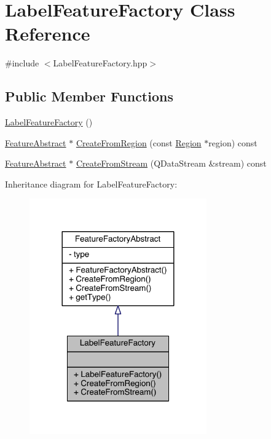 \hypertarget{class_label_feature_factory}{\section{Label\+Feature\+Factory Class Reference}
\label{class_label_feature_factory}
}


{\ttfamily \#include $<$Label\+Feature\+Factory.\+hpp$>$}

\subsection*{Public Member Functions}
\begin{DoxyCompactItemize}
\item 
\hyperlink{class_label_feature_factory_ab7fc88ba9a535add8497ca772786ee7b}{Label\+Feature\+Factory} ()
\item 
\hyperlink{class_feature_abstract}{Feature\+Abstract} $\ast$ \hyperlink{class_label_feature_factory_abd2653fa523f2dc26a07e9cc04d9052a}{Create\+From\+Region} (const \hyperlink{class_region}{Region} $\ast$region) const 
\item 
\hyperlink{class_feature_abstract}{Feature\+Abstract} $\ast$ \hyperlink{class_label_feature_factory_aa13d40899e9b323c3785187a7dcfd842}{Create\+From\+Stream} (Q\+Data\+Stream \&stream) const 
\end{DoxyCompactItemize}


Inheritance diagram for Label\+Feature\+Factory\+:\nopagebreak
\begin{figure}[H]
\begin{center}
\leavevmode
\includegraphics[width=216pt]{class_label_feature_factory__inherit__graph}
\end{center}
\end{figure}



